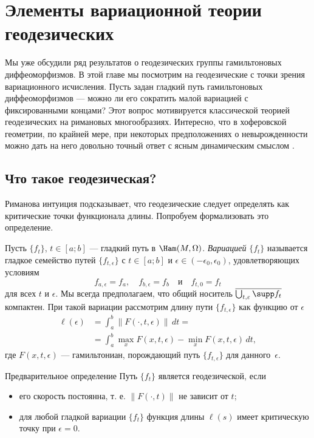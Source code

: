 \chapter[Геодезические]{Элементы вариационной теории геодезических}\label{chap:12}

Мы уже обсудили ряд результатов о геодезических группы гамильтоновых
диффеоморфизмов. 
В этой главе мы посмотрим на геодезические с точки зрения
вариационного исчисления. 
Пусть задан гладкий путь гамильтоновых диффеоморфизмов — можно ли
его сократить малой вариацией с фиксированными концами? 
Этот вопрос мотивируется классической теорией геодезических на
римановых многообразиях. 
Интересно, что в хоферовской геометрии, по крайней мере, при некоторых
предположениях о невырожденности можно дать на него довольно точный
ответ с ясным динамическим смыслом \cite{U}. 

\section{Что такое геодезическая?}

Риманова интуиция подсказывает, что геодезические следует определять
как критические точки функционала длины. 
Попробуем формализовать это определение.

Пусть $\{f_t\}$, $t\in[a; b]$ — гладкий путь в $\Ham(M,\Omega)$.
\emph{Вариацией} $\{f_t\}$ называется гладкое
семейство путей $\{f_{t,\epsilon}\}$ с $t \in [a; b]$ и $\epsilon \in
(-\epsilon_0, \epsilon_0)$, удовлетворяющих условиям
\[f_{a,\epsilon} = f_a,\quad f_{b,\epsilon} = f_b\quad\text{и}\quad f_{t,0} = f_t\]
для всех $t$ и $\epsilon$.
Мы всегда предполагаем, что общий носитель
$\overline{\bigcup_{t,\epsilon}\supp f_t}$ компактен.
При такой вариации рассмотрим длину пути $\{f_{t,\epsilon}\}$ как функцию от $\epsilon$ \index[symb]{$\ell(\epsilon)$}
\begin{align*}
\ell(\epsilon)&=\int_a^b\|F(\cdot,t,\epsilon)\|\,dt=
\\
&=\int_a^b \max_x F(x,t,\epsilon)-\min_x F(x,t,\epsilon)\,dt,
\end{align*} 
где $F(x, t, \epsilon)$ — гамильтониан, порождающий путь $\{f_{t,\epsilon}\}$ для данного~$\epsilon$.

\begin{ex}{Предварительное определение}\label{12.1.A}
Путь $\{f_t\}$ является геодезической, если
\begin{itemize}
\item его скорость постоянна, т. е. $\|F(\cdot, t)\|$ не зависит от $t$;
\item для любой гладкой вариации $\{f_t\}$ функция длины $\ell(s)$ имеет критическую точку при $\epsilon = 0$.
\end{itemize}
\end{ex}

